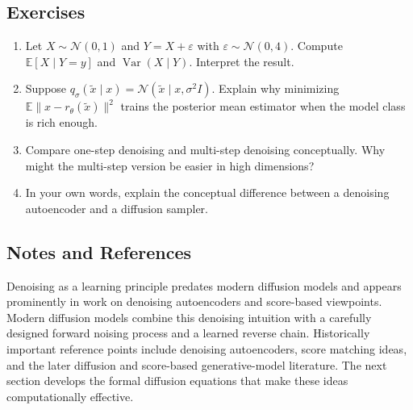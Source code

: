 \subsection*{Exercises}

\begin{enumerate}
    \item Let $X\sim \mathcal{N}(0,1)$ and $Y=X+\varepsilon$ with $\varepsilon\sim \mathcal{N}(0,4)$. Compute $\mathbb{E}[X\mid Y=y]$ and $\operatorname{Var}(X\mid Y)$. Interpret the result.
    \item Suppose $q_\sigma(\tilde x\mid x)=\mathcal{N}(\tilde x\mid x,\sigma^2 I)$. Explain why minimizing $\mathbb{E}\|x-r_\theta(\tilde x)\|^2$ trains the posterior mean estimator when the model class is rich enough.
    \item Compare one-step denoising and multi-step denoising conceptually. Why might the multi-step version be easier in high dimensions?
    \item In your own words, explain the conceptual difference between a denoising autoencoder and a diffusion sampler.
\end{enumerate}

\subsection*{Notes and References}

Denoising as a learning principle predates modern diffusion models and appears prominently in work on denoising autoencoders and score-based viewpoints.
Modern diffusion models combine this denoising intuition with a carefully designed forward noising process and a learned reverse chain.
Historically important reference points include denoising autoencoders, score matching ideas, and the later diffusion and score-based generative-model literature.
The next section develops the formal diffusion equations that make these ideas computationally effective.
